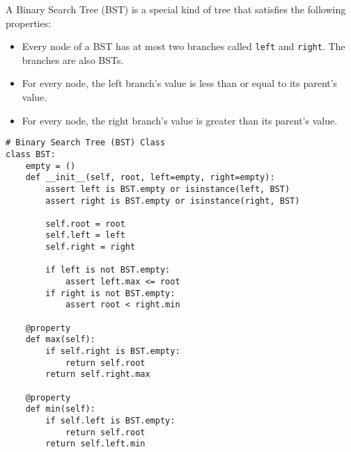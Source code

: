 A Binary Search Tree (BST) is a special kind of tree that satisfies the
following properties:
\begin{itemize}
\item Every node of a BST has at most two branches called \texttt{left} and \texttt{right}. The branches are also BSTs.
\item For every node, the left branch's value is less than or equal to its parent's value.
\item For every node, the right branch's value is greater than its parent's value.
\end{itemize}

\begin{lstlisting}
# Binary Search Tree (BST) Class
class BST:
    empty = ()
    def __init__(self, root, left=empty, right=empty):
        assert left is BST.empty or isinstance(left, BST)
        assert right is BST.empty or isinstance(right, BST)

        self.root = root
        self.left = left
        self.right = right

        if left is not BST.empty:
            assert left.max <= root
        if right is not BST.empty:
            assert root < right.min

    @property
    def max(self):
        if self.right is BST.empty:
            return self.root
        return self.right.max

    @property
    def min(self):
        if self.left is BST.empty:
            return self.root
        return self.left.min
\end{lstlisting}
